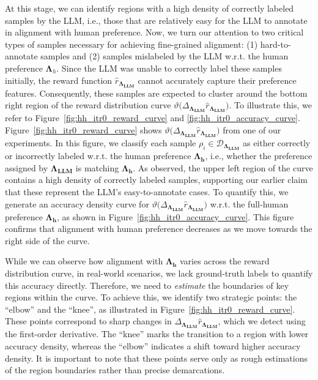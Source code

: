 At this stage, we can identify regions with a high density of correctly labeled samples by the LLM, i.e., those that are relatively easy for the LLM to annotate in alignment with human preference. Now, we turn our attention to two critical types of samples necessary for achieving fine-grained alignment: (1) hard-to-annotate samples and (2) samples mislabeled by the LLM w.r.t. the human preference $\mathbf{\Lambda}_h$. Since the LLM was unable to correctly label these samples initially, the reward function $\hat{r}_\mathbf{\Lambda_{LLM}}$ cannot accurately capture their preference features. Consequently, these samples are expected to cluster around the bottom right region of the reward distribution curve $\vartheta(\Delta_{\mathbf{\Lambda_{LLM}}}{\hat{r}_\mathbf{\Lambda_{LLM}})}$. To illustrate this, we refer to Figure~\ref{fig:hh_itr0_reward_curve} and \ref{fig:hh_itr0_accuracy_curve}. Figure~\ref{fig:hh_itr0_reward_curve} shows $\vartheta(\Delta_{\mathbf{\Lambda_{LLM}}}{\hat{r}_\mathbf{\Lambda_{LLM}})}$ from one of our experiments. In this figure, we classify each sample $\rho_i \in \mathcal{D}_{\mathbf{\Lambda_{LLM}}}$ as either correctly or incorrectly labeled w.r.t. the human preference $\mathbf{\Lambda_{h}}$, i.e., whether the preference assigned by $\mathbf{\Lambda_{LLM}}$ is matching $\mathbf{\Lambda_{h}}$.
As observed, the upper left region of the curve contains a high density of correctly labeled samples, supporting our earlier claim that these represent the LLM’s easy-to-annotate cases. To quantify this, we generate an accuracy density curve for $\vartheta(\Delta_{\mathbf{\Lambda_{LLM}}}{\hat{r}_\mathbf{\Lambda_{LLM}})}$ w.r.t. the full-human preference $\mathbf{\Lambda_{h}}$, as shown in Figure~\ref{fig:hh_itr0_accuracy_curve}. This figure confirms that alignment with human preference decreases as we move towards the right side of the curve.   

While we can observe how alignment with $\mathbf{\Lambda_{h}}$ varies across the reward distribution curve, in real-world scenarios, we lack ground-truth labels to quantify this accuracy directly. Therefore, we need to \textit{estimate} the boundaries of key regions within the curve. To achieve this, we identify two strategic points: the ``elbow'' and the ``knee'', as illustrated in Figure~\ref{fig:hh_itr0_reward_curve}. These points correspond to sharp changes in $\Delta_{\mathbf{\Lambda_{LLM}}}{\hat{r}_\mathbf{\Lambda_{LLM}}}$, which we detect using the first-order derivative. The ``knee'' marks the transition to a region with lower accuracy density, whereas the ``elbow'' indicates a shift toward higher accuracy density. It is important to note that these points serve only as rough estimations of the region boundaries rather than precise demarcations.

